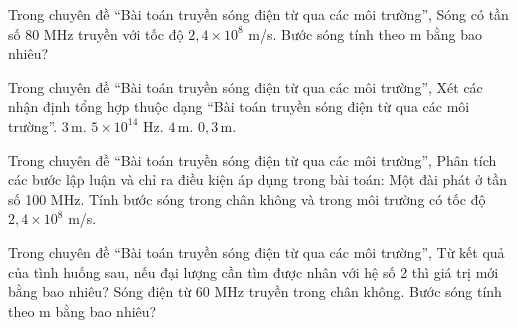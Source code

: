 \begin{ex}
Trong chuyên đề “Bài toán truyền sóng điện từ qua các môi trường”, Sóng có tần số 80 MHz truyền với tốc độ $2,4\times10^8$ m/s. Bước sóng tính theo m bằng bao nhiêu?
\end{ex}

\begin{ex}
Trong chuyên đề “Bài toán truyền sóng điện từ qua các môi trường”, Xét các nhận định tổng hợp thuộc dạng “Bài toán truyền sóng điện từ qua các môi trường”.
\choiceTF
{\True $3\,\text{m}$.}
{\True $5\times10^{14}$ Hz.}
{\True $4\,\text{m}$.}
{$0,3\,\text{m}$.}
\end{ex}

\begin{ex}
Trong chuyên đề “Bài toán truyền sóng điện từ qua các môi trường”, Phân tích các bước lập luận và chỉ ra điều kiện áp dụng trong bài toán: Một đài phát ở tần số 100 MHz. Tính bước sóng trong chân không và trong môi trường có tốc độ $2,4\times10^8$ m/s.
\choiceTF

\end{ex}

\begin{ex}
Trong chuyên đề “Bài toán truyền sóng điện từ qua các môi trường”, Từ kết quả của tình huống sau, nếu đại lượng cần tìm được nhân với hệ số 2 thì giá trị mới bằng bao nhiêu? Sóng điện từ 60 MHz truyền trong chân không. Bước sóng tính theo m bằng bao nhiêu?
\end{ex}

